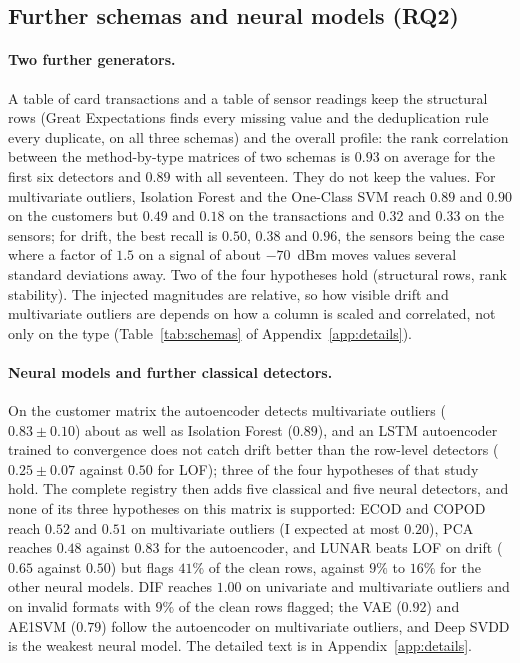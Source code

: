 \documentclass[conference]{IEEEtran}
\begin{document}
\subsection{Further schemas and neural models (RQ2)}
\label{sec:rq2-transfer}
\paragraph{Two further generators.} A table of card transactions and a table of sensor readings
keep the structural rows (Great Expectations finds every missing value and the deduplication rule
every duplicate, on all three schemas) and the overall profile: the rank correlation between the
method-by-type matrices of two schemas is $0.93$ on average for the first six detectors and $0.89$
with all seventeen. They do not keep the values. For multivariate outliers, Isolation Forest and
the One-Class SVM reach $0.89$ and $0.90$ on the customers but $0.49$ and $0.18$ on the
transactions and $0.32$ and $0.33$ on the sensors; for drift, the best recall is $0.50$, $0.38$ and
$0.96$, the sensors being the case where a factor of $1.5$ on a signal of about $-70$~dBm moves
values several standard deviations away. Two of the four hypotheses hold (structural rows, rank
stability). The injected magnitudes are relative, so how visible drift and multivariate outliers
are depends on how a column is scaled and correlated, not only on the type
(Table~\ref{tab:schemas} of Appendix~\ref{app:details}).

\paragraph{Neural models and further classical detectors.} On the customer matrix the
autoencoder detects multivariate outliers ($0.83 \pm 0.10$) about as well as Isolation Forest
($0.89$), and an LSTM autoencoder trained to convergence does not catch drift better than the
row-level detectors ($0.25 \pm 0.07$ against $0.50$ for LOF); three of the four hypotheses of that
study hold. The complete registry then adds five classical and five neural detectors, and none of
its three hypotheses on this matrix is supported: ECOD and COPOD reach $0.52$ and $0.51$ on
multivariate outliers (I expected at most $0.20$), PCA reaches $0.48$ against $0.83$ for the
autoencoder, and LUNAR beats LOF on drift ($0.65$ against $0.50$) but flags $41\%$ of the clean
rows, against $9\%$ to $16\%$ for the other neural models. DIF reaches $1.00$ on univariate and
multivariate outliers and on invalid formats with $9\%$ of the clean rows flagged; the VAE ($0.92$)
and AE1SVM ($0.79$) follow the autoencoder on multivariate outliers, and Deep SVDD is the weakest
neural model. The detailed text is in Appendix~\ref{app:details}.
\end{document}

